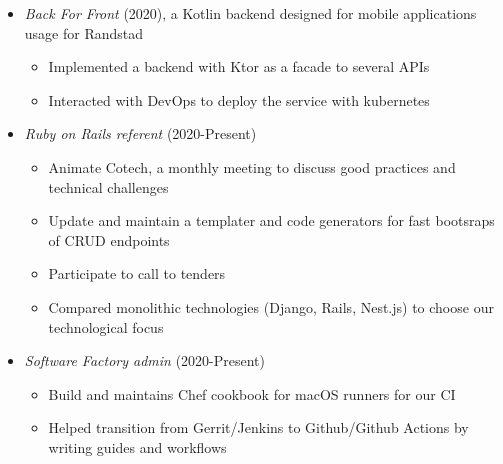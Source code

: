 \documentclass[10pt,a4paper,sans]{moderncv} %
\begin{document}
{\begin{itemize}
\begin{itemize}
	\item Implemented website and REST API with Ruby on Rails
	\item Deployed infrastructure on Azure in France and Hong-Kong with terraform
	\end{itemize}
\item \textit{Back For Front} (2020), a Kotlin backend designed for mobile applications usage for Randstad
	\begin{itemize}
	\item Implemented a backend with Ktor as a facade to several APIs
	\item Interacted with DevOps to deploy the service with kubernetes
	\end{itemize}
\item \textit{Ruby on Rails referent} (2020-Present)
	\begin{itemize}
	\item Animate Cotech, a monthly meeting to discuss good practices and technical challenges
	\item Update and maintain a templater and code generators for fast bootsraps of CRUD endpoints
	\item Participate to call to tenders
	\item Compared monolithic technologies (Django, Rails, Nest.js) to choose our technological focus
	\end{itemize}
\item \textit{Software Factory admin} (2020-Present)
	\begin{itemize}
	\item Build and maintains Chef cookbook for macOS runners for our CI
	\item Helped transition from Gerrit/Jenkins to Github/Github Actions by writing guides and workflows
	\end{itemize}
\end{itemize}}

\end{document}
